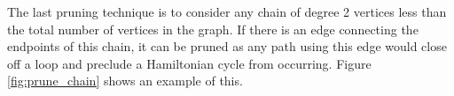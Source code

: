 \documentclass[twoside,11pt]{article}
\begin{document}
%
%
%
%



  The last pruning technique is to consider any chain
of degree 2 vertices less than the total number of vertices in the graph.
If there is an edge connecting the endpoints
of this chain, it can be pruned as any path using this edge would close off a loop and preclude a Hamiltonian cycle from
occurring.  Figure \ref{fig:prune_chain} shows an example of this.

\end{document}
